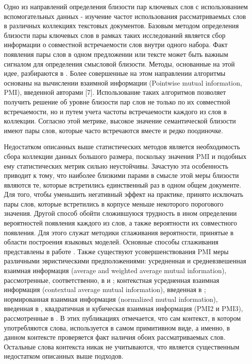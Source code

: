 Одно из направлений определения близости пар ключевых слов с использованием вспомогательных данных - изучение частот использования рассматриваемых слов в различных коллекциях текстовых документов. Базовым методом определения близости пары ключевых слов в рамках таких исследований является сбор информации о совместной встречаемости слов внутри одного набора. Факт появления пары слов в одном предложении или тексте может быть важным сигналом для определения смысловой близости. Методы, основанные на этой идее, разбираются в \cite{freq_1,freq_2,pmi}. Более совершенные на этом направлении алгоритмы основаны на вычислении взаимной информации (Pointwise mutual information, PMI), введенной авторами [7]. Использование таких алгоритмов позволяет получить решение об уровне близости пар слов  не только по их совместной встречаемости, но и путем учета частоты встречаемости каждого из слов в коллекции. Согласно этой метрике, высокое значение семантической близости имеют пары слов, которые часто встречаются вместе и редко поодиночке. 

Недостатком описанных выше статистических методов является необходимость сбора коллекции данных большого размера, поскольку значения PMI и подобных ему статистических метрик сильно неустойчивы.  Зачастую эта особенность приводит к тому, что наиболее близкими парами в смысле этой меры близости являются те, которые встретились единственный раз в одном общем документе. Для того, чтобы уменьшить негативный эффект на практике, принято исключать пары слов, которые встретились в корпусе меньше некоторого порогового значения. Другой способ обойти сложившуюся трудность в ином определении вероятностей появления каждого из слов, а также вероятности их совместного появления. Для этого служат методики сглаживания вероятности, принятые в области построения языковых моделей. Основные способы сглаживания представлены в работе \cite{lm}. Также существуют усовершенствования PMI меры различными эвристическими предположениями: усредненная и средневзвешенная взаимная информация (average and weighted average mutual information), рассмотренные, соответственно, в \cite{avg_pmi} и \cite{w_avg_pmi}; контекстная усредненная взаимная информация (contextual average mutual information), введенная в \cite{context_pmi}; нормированная взаимная информация (normalized mutual information), введенная в \cite{npmi}, квадратичная и кубическая взаимная информация (PMI2 и PMI3), рассмотренные в \cite{pmi23}.  В этих публикациях отмечается, что сам контекст, в котором употребляются слова, используется в самом примитивном виде, а именно, в данном контексте проверяется факт наличия обоих рассматриваемых слов. Остальные слова контекста никак не учитываются, что является существенным недостатком описанных выше подходов.

